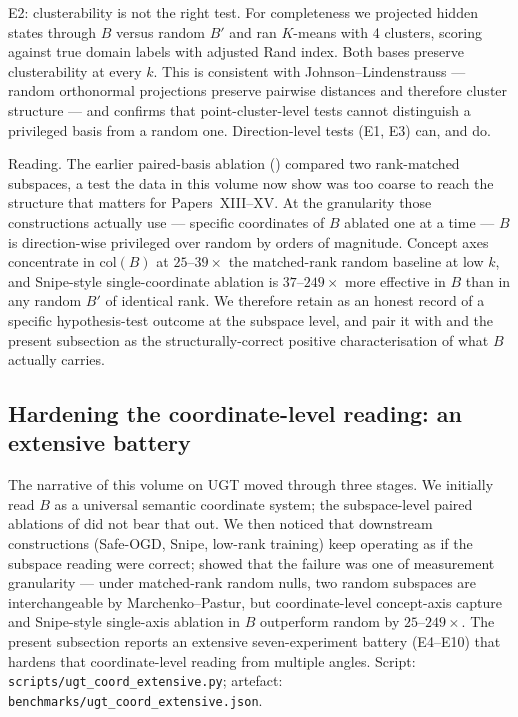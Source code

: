 \documentclass[11pt]{article}
\begin{document}
E2: clusterability is not the right test.
For completeness we projected hidden states through $B$ versus
random $B'$ and ran $K$-means with 4 clusters, scoring against true
domain labels with adjusted Rand index.  Both bases preserve
clusterability at every $k$.  This is consistent with
Johnson--Lindenstrauss --- random orthonormal projections preserve
pairwise distances and therefore cluster structure --- and confirms
that point-cluster-level tests cannot distinguish a privileged basis
from a random one.  Direction-level tests (E1, E3) can, and do.

Reading.  The earlier paired-basis ablation
() compared two rank-matched
subspaces, a test the data in this volume now show was too
coarse to reach the structure that matters for Papers~XIII--XV.  At
the granularity those constructions actually use --- specific
coordinates of $B$ ablated one at a time --- $B$ is direction-wise
privileged over random by orders of magnitude.  Concept axes
concentrate in $\mathrm{col}(B)$ at $25$--$39\times$ the matched-rank
random baseline at low $k$, and Snipe-style single-coordinate ablation
is $37$--$249\times$ more effective in $B$ than in any random $B'$ of
identical rank.  We therefore retain
 as an honest record of a specific
hypothesis-test outcome at the subspace level, and pair it with
 and the present subsection
as the structurally-correct positive characterisation of what $B$
actually carries.

\subsection{Hardening the coordinate-level reading: an extensive battery}
\label{sec:ugt-extensive-battery}

The narrative of this volume on UGT moved through three stages.
We initially read $B$ as a universal semantic coordinate system; the
subspace-level paired ablations of  did
not bear that out. We then noticed that downstream constructions
(Safe-OGD, Snipe, low-rank training) keep operating as if the
subspace reading were correct; 
showed that the failure was one of measurement granularity --- under
matched-rank random nulls, two random subspaces are interchangeable
by Marchenko--Pastur, but coordinate-level concept-axis
capture and Snipe-style single-axis ablation in $B$ outperform random
by $25$--$249\times$.  The present subsection reports an
extensive seven-experiment battery (E4--E10) that hardens that
coordinate-level reading from multiple angles.  Script:
\texttt{scripts/ugt\_coord\_extensive.py};
artefact: \texttt{benchmarks/ugt\_coord\_extensive.json}.
\end{document}
